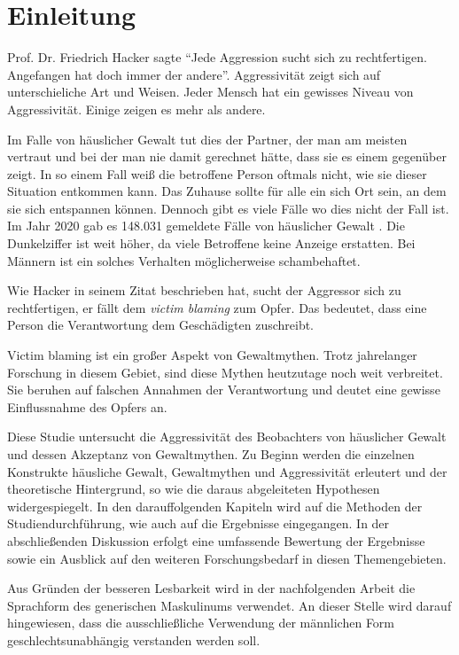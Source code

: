 \chapter{Einleitung}   \label{ch_1}
Prof. Dr. Friedrich Hacker sagte \enquote{Jede Aggression sucht sich zu rechtfertigen. Angefangen hat doch immer der andere}. \parencite{Friedrich_Hacker} Aggressivität zeigt sich auf unterschieliche Art und Weisen. Jeder Mensch hat ein gewisses Niveau von Aggressivität. Einige zeigen es mehr als andere. 


Im Falle von häuslicher Gewalt tut dies der Partner, der man am meisten vertraut und 
bei der man nie damit gerechnet hätte, dass sie es einem gegenüber zeigt. In so einem 
Fall weiß die betroffene Person oftmals nicht, wie sie dieser Situation entkommen kann. 
Das Zuhause sollte für alle ein sich Ort sein, an dem sie sich entspannen können. 
Dennoch gibt es viele Fälle wo dies nicht der Fall ist. Im Jahr 2020 gab es 148.031 
gemeldete Fälle von häuslicher Gewalt \parencite{häusliche_Gewalt}. 
Die Dunkelziffer ist weit höher, da viele Betroffene keine Anzeige erstatten. Bei Männern
ist ein solches Verhalten möglicherweise schambehaftet.

Wie Hacker \parencite{Friedrich_Hacker} 
in seinem Zitat beschrieben hat, sucht der Aggressor sich zu rechtfertigen, er fällt
dem \textit{victim blaming} zum Opfer. Das bedeutet, dass eine Person die Verantwortung
dem Geschädigten zuschreibt. 

Victim blaming ist ein großer Aspekt von Gewaltmythen. Trotz jahrelanger Forschung in 
diesem Gebiet, sind diese Mythen heutzutage noch weit verbreitet. 
Sie beruhen auf falschen Annahmen der Verantwortung und deutet eine gewisse Einflussnahme 
des Opfers an.

Diese Studie untersucht die Aggressivität des Beobachters von häuslicher Gewalt und 
dessen Akzeptanz von Gewaltmythen. Zu Beginn werden die einzelnen Konstrukte häusliche 
Gewalt, Gewaltmythen und Aggressivität erleutert und der theoretische Hintergrund, so wie 
die daraus abgeleiteten Hypothesen widergespiegelt. In den darauffolgenden Kapiteln wird 
auf die Methoden der Studiendurchführung, wie auch auf die Ergebnisse eingegangen. In der 
abschließenden Diskussion erfolgt eine umfassende Bewertung der Ergebnisse sowie ein 
Ausblick auf den weiteren Forschungsbedarf in diesen Themengebieten.

Aus Gründen der besseren Lesbarkeit wird in der nachfolgenden Arbeit die Sprachform des
generischen Maskulinums verwendet. An dieser Stelle wird darauf hingewiesen, dass die 
ausschließliche Verwendung der männlichen Form geschlechtsunabhängig verstanden werden 
soll.